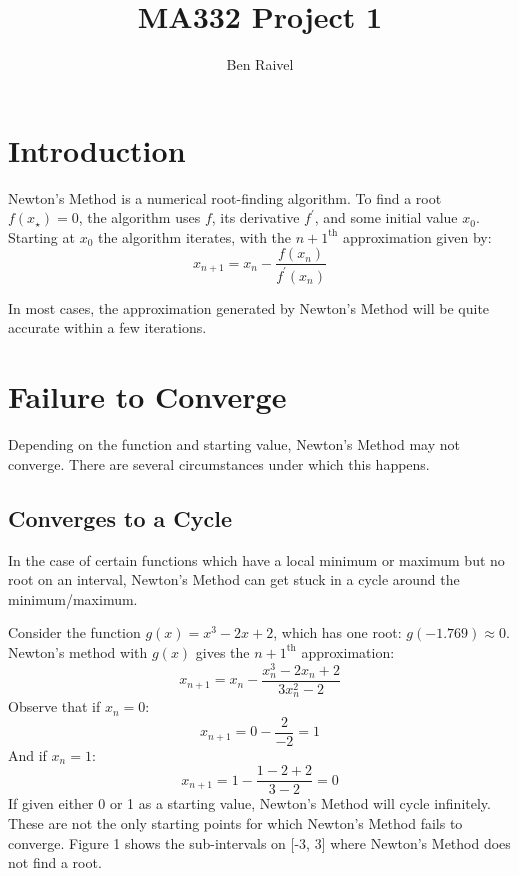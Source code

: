 \documentclass[10pt,a4paper]{article}
\title{MA332 Project 1}
\author{Ben Raivel}
\begin{document}
	\maketitle
	\section{Introduction}
	Newton's Method is a numerical root-finding algorithm. To find a root $ f(x_\star) = 0 $, the algorithm uses $f$, its derivative $f^\prime$, and some initial value $x_0$. Starting at $x_0$ the algorithm iterates, with the  $ n+1^\text{th} $ approximation given by:
	$$ x_{n+1} = x_n - \frac{f(x_n)}{f^\prime(x_n)} $$

	In most cases, the approximation generated by Newton's Method will be quite accurate within a few iterations.
	\section{Failure to Converge}
	Depending on the function and starting value, Newton's Method may not converge. There are several circumstances under which this happens.
	
		\subsection{Converges to a Cycle}
		
		In the case of certain functions which have a local minimum or maximum but no root on an interval, Newton's Method can get stuck in a cycle around the minimum/maximum.
		
		Consider the function $ g(x) = x^3 - 2x  + 2 $, which has one root: $ g(-1.769) \approx 0$. Newton's method with $g(x)$ gives the $ n+1^\text{th} $ approximation:
		$$ x_{n+1} = x_n - \frac{x_n^3 - 2x_n + 2}{3x_n^2 - 2} $$
		Observe that if $x_n = 0$:
		$$ x_{n+1} = 0 - \frac{2}{-2} = 1 $$
		And if $x_n = 1$:
		$$ x_{n+1} = 1 - \frac{1 - 2 + 2}{3 - 2} =  0 $$		
		If given either 0 or 1 as a starting value, Newton's Method will cycle infinitely.  These are not the only starting points for which Newton's Method fails to converge. Figure 1 shows the sub-intervals on [-3, 3] where Newton's Method does not find a root.
		
\end{document}
